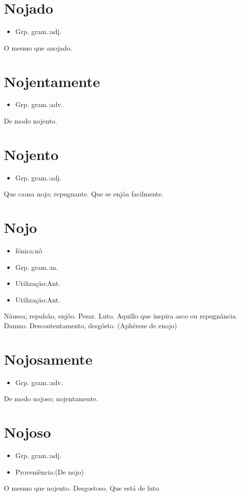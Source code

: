 \section{Nojado}
\begin{itemize}
\item {Grp. gram.:adj.}
\end{itemize}
O mesmo que \textunderscore anojado\textunderscore .
\section{Nojentamente}
\begin{itemize}
\item {Grp. gram.:adv.}
\end{itemize}
De modo nojento.
\section{Nojento}
\begin{itemize}
\item {Grp. gram.:adj.}
\end{itemize}
Que causa nojo; repugnante.
Que se enjôa facilmente.
\section{Nojo}
\begin{itemize}
\item {fónica:nô}
\end{itemize}
\begin{itemize}
\item {Grp. gram.:m.}
\end{itemize}
\begin{itemize}
\item {Utilização:Ant.}
\end{itemize}
\begin{itemize}
\item {Utilização:Ant.}
\end{itemize}
Náusea; repulsão, enjôo.
Pesar.
Luto.
Aquillo que inspira asco ou repugnância.
Damno.
Descontentamento, desgôsto.
(Aphérese de \textunderscore enojo\textunderscore )
\section{Nojosamente}
\begin{itemize}
\item {Grp. gram.:adv.}
\end{itemize}
De modo nojoso; nojentamente.
\section{Nojoso}
\begin{itemize}
\item {Grp. gram.:adj.}
\end{itemize}
\begin{itemize}
\item {Proveniência:(De \textunderscore nojo\textunderscore )}
\end{itemize}
O mesmo que \textunderscore nojento\textunderscore .
Desgostoso.
Que está de luto.
